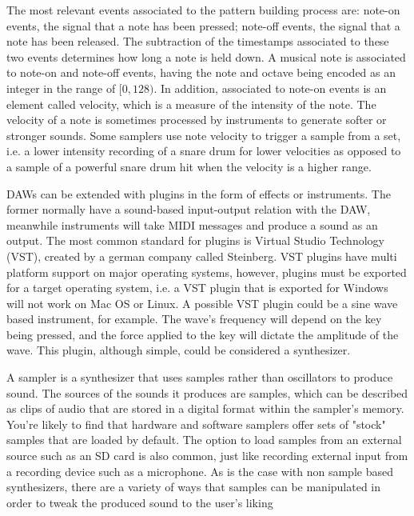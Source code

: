 \documentclass[12pt, a4paper, hidelinks]{article}
\begin{document}
	The most relevant events associated to the pattern building process are: note-on events, the signal that a note has been pressed; note-off events, the signal that a note has been released. The subtraction of the timestamps associated to these two events determines how long a note is held down. A musical note is associated to note-on and note-off events, having the note and octave being encoded as an integer in the range of $[0, 128)$. In addition, associated to note-on events is an element called velocity, which is a measure of the intensity of the note. The velocity of a note is sometimes processed by instruments to generate softer or stronger sounds. Some samplers use note velocity to trigger a sample from a set, i.e. a lower intensity recording of a snare drum for lower velocities as opposed to a sample of a powerful snare drum hit when the velocity is a higher range.
 	\par
 	
	DAWs can be extended with plugins in the form of effects or instruments. The former normally have a sound-based input-output relation with the DAW, meanwhile instruments will take MIDI messages and produce a sound as an output. The most common standard for plugins is Virtual Studio Technology (VST), created by a german company called Steinberg. VST plugins have multi platform support on major operating systems, however, plugins must be exported for a target operating system, i.e. a VST plugin that is exported for Windows will not work on Mac OS or Linux. A possible VST plugin could be a sine wave based instrument, for example. The wave's frequency will depend on the key being pressed, and the force applied to the key will dictate the amplitude of the wave. This plugin, although simple, could be considered a synthesizer. \par 
	A sampler is a synthesizer that uses samples rather than oscillators to produce sound.  The sources of the sounds it produces are samples, which can be described as clips of audio that are stored in a digital format within the sampler's memory. You're likely to find that hardware and software samplers offer sets of "stock" samples that are loaded by default. The option to load samples from an external source such as an SD card is also common, just like recording external input from a recording device such as a microphone. As is the case with non sample based synthesizers, there are a variety of ways that samples can be manipulated in order to tweak the produced sound to the user's liking\par
	
\end{document}
